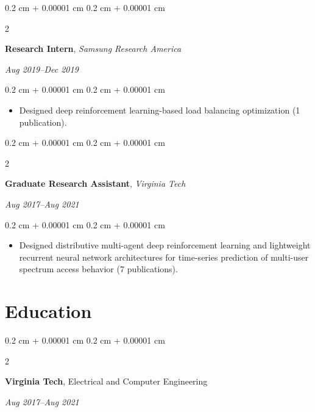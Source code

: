 \documentclass[10pt, letterpaper]{article}
\newenvironment{highlights}{
    \begin{itemize}[
        topsep=0.10 cm,
        parsep=0.10 cm,
        partopsep=0pt,
        itemsep=0pt,
        leftmargin=0.4 cm + 10pt
    ]
}{
    \end{itemize}
} %
\newenvironment{onecolentry}{
    \begin{adjustwidth}{
        0.2 cm + 0.00001 cm
    }{
        0.2 cm + 0.00001 cm
    }
}{
    \end{adjustwidth}
} %
\newenvironment{twocolentry}[2][]{
    \onecolentry
    \def\secondColumn{#2}
    \setcolumnwidth{\fill, 3.5 cm}
    \begin{paracol}{2}
}{
    \switchcolumn \raggedleft \secondColumn
    \end{paracol}
    \endonecolentry
} %
\begin{document}
        \vspace{0.10 cm}

        \begin{twocolentry}{

        {\small \textit{Aug 2019–Dec 2019}}}
            \textbf{Research Intern}, \textit{Samsung Research America}

        \end{twocolentry}

        \vspace{0.10 cm}
        \begin{onecolentry}
            \begin{highlights}
                \item Designed deep reinforcement learning-based load balancing optimization (1 publication).
            \end{highlights}
        \end{onecolentry}

        \vspace{0.10 cm}

        \begin{twocolentry}{

        {\small \textit{Aug 2017–Aug 2021}}}
            \textbf{Graduate Research Assistant}, \textit{Virginia Tech}

        \end{twocolentry}

        \vspace{0.10 cm}
        \begin{onecolentry}
            \begin{highlights}
                \item Designed distributive multi-agent deep reinforcement learning and lightweight recurrent neural network architectures for time-series prediction of multi-user spectrum access behavior (7 publications).
            \end{highlights}
        \end{onecolentry}



    
    \section{Education}
        \begin{twocolentry}{
        {\small \textit{Aug 2017–Aug 2021}}}
               \textbf{Virginia Tech}, Electrical and Computer Engineering 
        \end{twocolentry}
\end{document}
